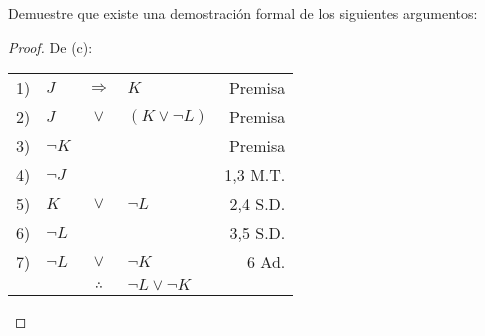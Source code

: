 \documentclass[12pt]{report}
\theoremstyle{largebreak}
\begin{document}
    \begin{excer}
        Demuestre que existe una demostración formal de los siguientes argumentos:
    \end{excer}

    \begin{proof}
        De (c):
        \begin{center}
            \begin{tabular}{l l c l r}
                1) & $J$ & $\Rightarrow$ & $K$ & Premisa \\
                2) & $J$ & $\lor$ & $(K\lor\neg L)$ & Premisa \\
                3) & $\neg K$ &  &  & Premisa \\
                4) & $\neg J$ &  &  & 1,3 M.T.\\
                5) & $K$ & $\lor$ & $\neg L$ & 2,4 S.D.\\
                6) & $\neg L$ &  &  & 3,5 S.D.\\
                7) & $\neg L$ & $\lor$ & $\neg K$ & 6 Ad. \\
                \hline
                & & $\therefore$ & $\neg L\lor\neg K$ & \\
            \end{tabular}
        \end{center}


\end{proof}
\end{document}

